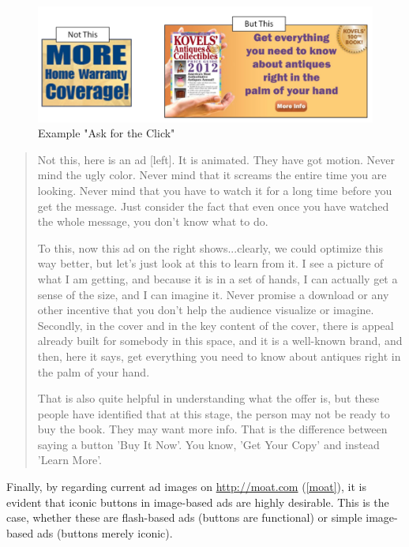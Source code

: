 \begin{figure}
\centerline{
  \includegraphics[scale=.25]{chapter6.tex/banner}
  }
\caption{Example "Ask for the Click" \citep{BannerAdDesign:2011tg}}
\label{askforclick}
\end{figure}
\begin{quotation}
Not this, here is an ad [left]. It is animated. They have got motion. Never mind the ugly color. Never mind that it screams the entire time you are looking. Never mind that you have to watch it for a long time before you get the message. Just consider the fact that even once you have watched the whole message, you don't know what to do.

To this, now this ad on the right shows...clearly, we could optimize this way better, but let's just look at this to learn from it. I see a picture of what I am getting, and because it is in a set of hands, I can actually get a sense of the size, and I can imagine it. Never promise a download or any other incentive that you don't help the audience visualize or imagine. Secondly, in the cover and in the key content of the cover, there is appeal already built for somebody in this space, and it is a well-known brand, and then, here it says, get everything you need to know about antiques right in the palm of your hand.

That is also quite helpful in understanding what the offer is, but these people have identified that at this stage, the person may not be ready to buy the book. They may want more info. That is the difference between saying a button 'Buy It Now'. You know, 'Get Your Copy' and instead 'Learn More'. \citep{BannerAdDesign:2011tg}
\end{quotation}


Finally, by regarding current ad images on  \url{http://moat.com} (\autoref{moat}),  it is evident that iconic buttons in image-based ads are highly desirable. This is the case, whether these are flash-based ads (buttons are functional) or simple image-based ads (buttons merely iconic).



